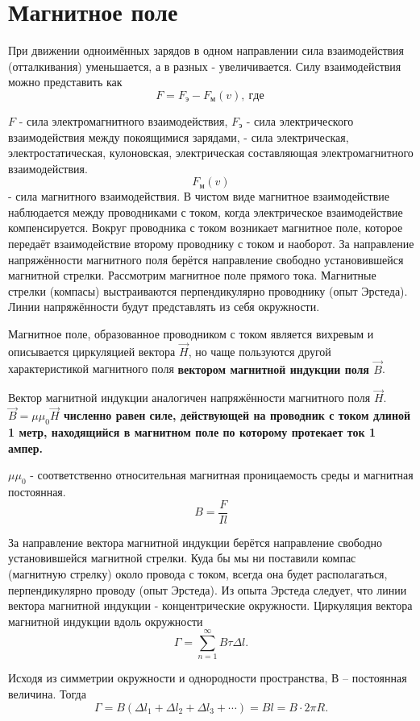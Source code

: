 \documentclass[a5paper, 10pt]{diss_4}
\renewcommand{\'}{\,'}
\begin{document}
\section{Магнитное поле}
При движении одноимённых зарядов в одном направлении сила взаимодействия (отталкивания) уменьшается, а в разных - увеличивается. Силу взаимодействия можно представить как
\[
F=F_э-F_м(v),\ где\
\]

$F$ - сила электромагнитного взаимодействия, $F_э$ - сила электрического взаимодействия между покоящимися зарядами, - сила электрическая, электростатическая, кулоновская, электрическая составляющая электромагнитного взаимодействия. $$F_м(v)$$ - сила магнитного взаимодействия. В чистом виде магнитное взаимодействие наблюдается между проводниками с током, когда электрическое взаимодействие компенсируется. Вокруг проводника с током возникает магнитное поле, которое передаёт взаимодействие второму проводнику с током и наоборот. За направление напряжённости магнитного поля берётся направление свободно установившейся магнитной стрелки.  Рассмотрим магнитное поле прямого тока.   Магнитные стрелки (компасы) выстраиваются перпендикулярно проводнику (опыт Эрстеда). Линии напряжённости будут представлять из себя окружности.

Магнитное поле, образованное проводником с током  является вихревым и описывается циркуляцией вектора  $\vec{H}$, но чаще пользуются другой характеристикой магнитного поля \textbf{вектором магнитной индукции поля $\vec{B}$}.

Вектор магнитной индукции аналогичен напряжённости магнитного поля $\vec{H}$. \textbf{$\vec{B}=\mu\mu_0\vec{H}$ численно равен силе, действующей на проводник с током длиной 1 метр, находящийся в магнитном поле по которому протекает ток 1 ампер.}

$\mu\mu_0$ - соответственно относительная магнитная проницаемость среды и магнитная постоянная.
\[
B=\frac{F}{Il}
\]

За направление вектора магнитной индукции берётся направление свободно установившейся магнитной стрелки. Куда бы мы ни поставили компас (магнитную стрелку) около провода с током, всегда она будет располагаться, перпендикулярно проводу (опыт Эрстеда). Из опыта Эрстеда следует, что линии вектора магнитной индукции - концентрические окружности. Циркуляция вектора магнитной индукции вдоль окружности
\[
\Gamma=\sum\limits_{n=1}^{\infty}B\tau\Delta l.
\]

Исходя из симметрии окружности и однородности пространства, В -- постоянная величина. Тогда
\[
\Gamma=B(\Delta l_1+\Delta l_2+\Delta l_3+\cdots)=Bl=B\cdot 2\pi R.
\]
\end{document}
